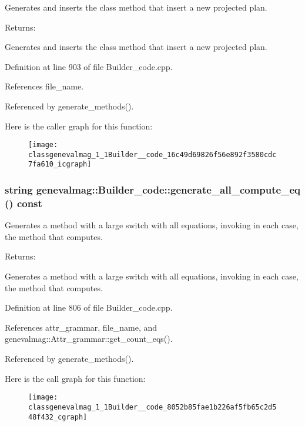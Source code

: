 Generates and inserts the class method that insert a new projected plan. \begin{Desc}
\item[Returns:]\end{Desc}
Generates and inserts the class method that insert a new projected plan. 

Definition at line 903 of file Builder\_\-code.cpp.

References file\_\-name.

Referenced by generate\_\-methods().

Here is the caller graph for this function:\nopagebreak
\begin{figure}[H]
\begin{center}
\leavevmode
\texttt{[image: classgenevalmag\_1\_1Builder\_\_code\_16c49d69826f56e892f3580cdc7fa610\_icgraph]}
\end{center}
\end{figure}
\hypertarget{classgenevalmag_1_1Builder__code_8052b85fae1b226af5fb65c2d548f432}{
\subsubsection[{generate\_\-all\_\-compute\_\-eq}]{\setlength{\rightskip}{0pt plus 5cm}string genevalmag::Builder\_\-code::generate\_\-all\_\-compute\_\-eq () const}}
\label{classgenevalmag_1_1Builder__code_8052b85fae1b226af5fb65c2d548f432}


Generates a method with a large switch with all equations, invoking in each case, the method that computes. \begin{Desc}
\item[Returns:]\end{Desc}
Generates a method with a large switch with all equations, invoking in each case, the method that computes. 

Definition at line 806 of file Builder\_\-code.cpp.

References attr\_\-grammar, file\_\-name, and genevalmag::Attr\_\-grammar::get\_\-count\_\-eqs().

Referenced by generate\_\-methods().

Here is the call graph for this function:\nopagebreak
\begin{figure}[H]
\begin{center}
\leavevmode
\texttt{[image: classgenevalmag\_1\_1Builder\_\_code\_8052b85fae1b226af5fb65c2d548f432\_cgraph]}
\end{center}
\end{figure}


